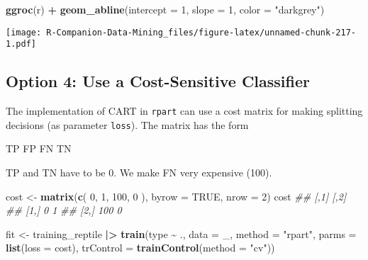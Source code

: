 \documentclass[
  notitlepage]{book}
\newenvironment{Shaded}{\begin{snugshade}}{\end{snugshade}}
\newcommand{\CommentTok}[1]{\textcolor[rgb]{0.56,0.35,0.01}{\textit{#1}}}
\newcommand{\DataTypeTok}[1]{\textcolor[rgb]{0.13,0.29,0.53}{#1}}
\newcommand{\DecValTok}[1]{\textcolor[rgb]{0.00,0.00,0.81}{#1}}
\newcommand{\ErrorTok}[1]{\textcolor[rgb]{0.64,0.00,0.00}{\textbf{#1}}}
\newcommand{\KeywordTok}[1]{\textcolor[rgb]{0.13,0.29,0.53}{\textbf{#1}}}
\newcommand{\NormalTok}[1]{#1}
\newcommand{\OperatorTok}[1]{\textcolor[rgb]{0.81,0.36,0.00}{\textbf{#1}}}
\newcommand{\OtherTok}[1]{\textcolor[rgb]{0.56,0.35,0.01}{#1}}
\newcommand{\StringTok}[1]{\textcolor[rgb]{0.31,0.60,0.02}{#1}}
\begin{document}
\begin{Shaded}
\begin{Highlighting}[]
\KeywordTok{ggroc}\NormalTok{(r) }\OperatorTok{+}\StringTok{ }\KeywordTok{geom\_abline}\NormalTok{(}\DataTypeTok{intercept =} \DecValTok{1}\NormalTok{, }\DataTypeTok{slope =} \DecValTok{1}\NormalTok{, }\DataTypeTok{color =} \StringTok{"darkgrey"}\NormalTok{)}
\end{Highlighting}
\end{Shaded}

\texttt{[image: R-Companion-Data-Mining\_files/figure-latex/unnamed-chunk-217-1.pdf]}

\hypertarget{option-4-use-a-cost-sensitive-classifier}{%
\subsection{Option 4: Use a Cost-Sensitive Classifier}\label{option-4-use-a-cost-sensitive-classifier}}

The implementation of CART in \texttt{rpart} can use a cost matrix for making
splitting decisions (as parameter \texttt{loss}). The matrix has the form

TP FP FN TN

TP and TN have to be 0. We make FN very expensive (100).

\begin{Shaded}
\begin{Highlighting}[]
\NormalTok{cost \textless{}{-}}\StringTok{ }\KeywordTok{matrix}\NormalTok{(}\KeywordTok{c}\NormalTok{(}
  \DecValTok{0}\NormalTok{,   }\DecValTok{1}\NormalTok{,}
  \DecValTok{100}\NormalTok{, }\DecValTok{0}
\NormalTok{), }\DataTypeTok{byrow =} \OtherTok{TRUE}\NormalTok{, }\DataTypeTok{nrow =} \DecValTok{2}\NormalTok{)}
\NormalTok{cost}
\CommentTok{\#\#      [,1] [,2]}
\CommentTok{\#\# [1,]    0    1}
\CommentTok{\#\# [2,]  100    0}
\end{Highlighting}
\end{Shaded}

\begin{Shaded}
\begin{Highlighting}[]
\NormalTok{fit \textless{}{-}}\StringTok{ }\NormalTok{training\_reptile }\OperatorTok{|}\ErrorTok{\textgreater{}}\StringTok{ }
\StringTok{  }\KeywordTok{train}\NormalTok{(type }\OperatorTok{\textasciitilde{}}\StringTok{ }\NormalTok{.,}
        \DataTypeTok{data =}\NormalTok{ \_,}
        \DataTypeTok{method =} \StringTok{"rpart"}\NormalTok{,}
        \DataTypeTok{parms =} \KeywordTok{list}\NormalTok{(}\DataTypeTok{loss =}\NormalTok{ cost),}
        \DataTypeTok{trControl =} \KeywordTok{trainControl}\NormalTok{(}\DataTypeTok{method =} \StringTok{"cv"}\NormalTok{))}
\end{Highlighting}
\end{Shaded}
\end{document}
